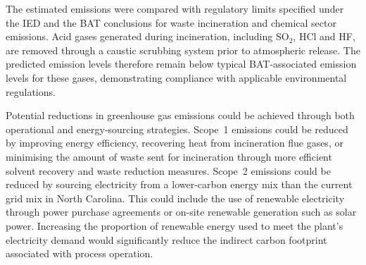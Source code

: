The estimated emissions were compared with regulatory limits specified under the IED and the BAT conclusions for waste incineration and chemical sector emissions. Acid gases generated during incineration, including SO$_2$, HCl and HF, are removed through a caustic scrubbing system prior to atmospheric release. The predicted emission levels therefore remain below typical BAT-associated emission levels for these gases, demonstrating compliance with applicable environmental regulations.

Potential reductions in greenhouse gas emissions could be achieved through both operational and energy-sourcing strategies. Scope~1 emissions could be reduced by improving energy efficiency, recovering heat from incineration flue gases, or minimising the amount of waste sent for incineration through more efficient solvent recovery and waste reduction measures. Scope~2 emissions could be reduced by sourcing electricity from a lower-carbon energy mix than the current grid mix in North Carolina. This could include the use of renewable electricity through power purchase agreements or on-site renewable generation such as solar power. Increasing the proportion of renewable energy used to meet the plant's electricity demand would significantly reduce the indirect carbon footprint associated with process operation.

